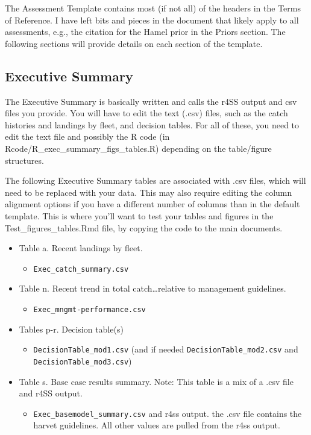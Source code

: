 \documentclass[12pt,]{article}
\providecommand{\tightlist}{%
  \setlength{\itemsep}{0pt}\setlength{\parskip}{0pt}}
\begin{document}
The Assessment Template contains most (if not all) of the headers in the
Terms of Reference. I have left bits and pieces in the document that
likely apply to all assessments, e.g., the citation for the Hamel prior
in the Priors section. The following sections will provide details on
each section of the template.

\subsection{Executive Summary}\label{executive-summary}

The Executive Summary is basically written and calls the r4SS output and
csv files you provide. You will have to edit the text (.csv) files, such
as the catch histories and landings by fleet, and decision tables. For
all of these, you need to edit the text file and possibly the R code (in
Rcode/R\_exec\_summary\_figs\_tables.R) depending on the table/figure
structures.

The following Executive Summary tables are associated with .csv files,
which will need to be replaced with your data. This may also require
editing the column alignment options if you have a different number of
columns than in the default template. This is where you'll want to test
your tables and figures in the Test\_figures\_tables.Rmd file, by
copying the code to the main documents.

\begin{itemize}
\tightlist
\item
  Table a. Recent landings by fleet.

  \begin{itemize}
  \tightlist
  \item
    \texttt{Exec\_catch\_summary.csv}
  \end{itemize}
\item
  Table n. Recent trend in total catch\ldots{}relative to management
  guidelines.

  \begin{itemize}
  \tightlist
  \item
    \texttt{Exec\_mngmt-performance.csv}
  \end{itemize}
\item
  Tables p-r. Decision table(s)

  \begin{itemize}
  \tightlist
  \item
    \texttt{DecisionTable\_mod1.csv} (and if needed
    \texttt{DecisionTable\_mod2.csv} and
    \texttt{DecisionTable\_mod3.csv})
  \end{itemize}
\item
  Table s. Base case results summary. Note: This table is a mix of a
  .csv file and r4SS output.

  \begin{itemize}
  \tightlist
  \item
    \texttt{Exec\_basemodel\_summary.csv} and r4ss output. the .csv file
    contains the harvet guidelines. All other values are pulled from the
    r4ss output.
  \end{itemize}
\end{itemize}
\end{document}
